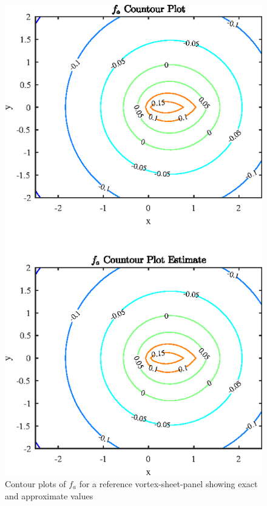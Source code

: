 


  
\begin{figure}[H]
\centering
\includegraphics[scale=1.55]{graphs/e2g1.eps}
\caption{Contour plots of $f_a$ for a reference vortex-sheet-panel showing exact and approximate values}
\label{e2g1}
\end{figure}


